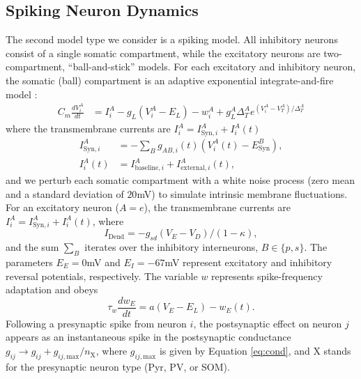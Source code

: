 \documentclass[a4paper,10pt]{article}
\begin{document}




\subsection{Spiking Neuron Dynamics}

The second model type we consider is a spiking model. All inhibitory neurons consist of a single somatic compartment, while the excitatory neurons are two-compartment, ``ball-and-stick'' models. For each excitatory and inhibitory neuron, the somatic (ball) compartment is an adaptive exponential integrate-and-fire model \cite{brette2005adaptive,litwin2016inhibitory}:
\begin{equation*}
 \begin{split}
  C_m \frac{dV^A_i}{dt} &= I_i^A -g_L (V^A_i-E_L) - w^A_i + g_L^A \Delta_T^A e^{(V^A_i-V_T^A)/\Delta_T^A} \end{split}
\end{equation*}
where the transmembrane currents are $I_i^A = I_{\text{Syn},i}^A + I_i^A(t)$
\begin{align*}
 I_{\text{Syn},i}^A &= -\sum_{B}g_{AB,i}(t)(V_i^A(t)-E_\text{Syn}^B),\\
 I^A_i(t) &= I_{\text{baseline},i}^A + I_{\text{external},i}^A(t),
\end{align*}
and we perturb each somatic compartment with a white noise process (zero mean and a standard deviation of $20$mV) to simulate intrinsic membrane fluctuations. For an excitatory neuron ($A=e$), the transmembrane currents are $I_i^A = I_{\text{Syn},i}^A + I_i^A(t)$, where
\begin{equation*}
 I_\text{Dend} = -g_{sd}(V_E-V_D)/(1-\kappa),
\end{equation*}
and the sum $\sum_B$ iterates over the inhibitory interneurons, $B\in \{p,s\}$.
The parameters $E_E=0$mV and $E_I=-67$mV represent excitatory and inhibitory reversal potentials, respectively. The variable $w$ represents spike-frequency adaptation and obeys
\begin{equation*}
 \tau_w\frac{dw_E}{dt} = a\left(V_E - E_L\right) - w_E(t).
\end{equation*}
Following a presynaptic spike from neuron $i$, the postsynaptic effect on neuron $j$ appears as an instantaneous spike in the postsynaptic conductance $g_{ij} \rightarrow g_{ij} + g_{ij,\text{max}}/n_\text{X}$, where $g_{ij,\text{max}}$ is given by Equation \eqref{eq:cond}, and X stands for the presynaptic neuron type (Pyr, PV, or SOM).
\end{document}
